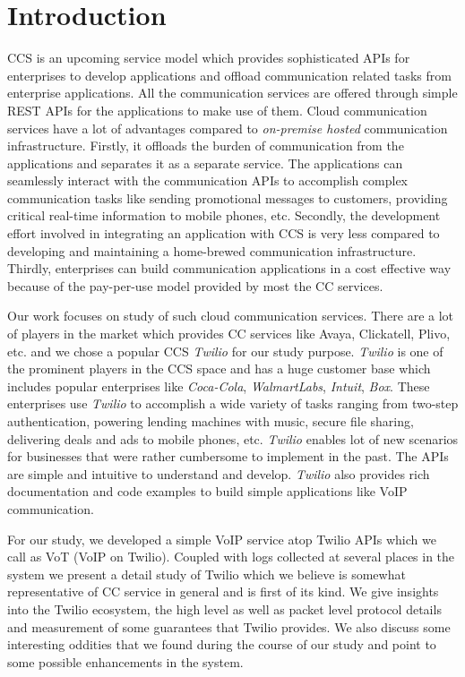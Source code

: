 \section{Introduction}
\label{sec-intro}
CCS is an upcoming service model which provides sophisticated APIs for enterprises to develop applications and offload communication related tasks from enterprise applications. 
All the communication services are offered through simple REST APIs for the applications to make use of them. Cloud communication services have a lot of advantages compared to \textit{on-premise hosted} communication infrastructure. Firstly, it offloads the burden of communication from the applications and separates it as a separate service. The applications can seamlessly interact with the communication APIs to accomplish complex communication tasks like sending promotional messages to customers, providing critical real-time information to mobile phones, etc. Secondly, the development effort involved in integrating an application with CCS is very less compared to developing and maintaining a home-brewed communication infrastructure.
Thirdly, enterprises can build communication applications in a cost effective way because of the pay-per-use model provided by most the CC services. 


Our work focuses on study of such cloud communication services. There are a lot of players in the market which provides CC services like Avaya, Clickatell, Plivo, etc. and we chose a popular CCS \textit{Twilio} for our study purpose. \textit{Twilio} is one of the prominent players in the CCS space and has a huge customer base which includes popular enterprises like \textit{Coca-Cola}, \textit{WalmartLabs}, \textit{Intuit}, \textit{Box}. These enterprises use \textit{Twilio} to accomplish a wide variety of tasks ranging from two-step authentication, powering lending machines with music, secure file sharing, delivering deals and ads to mobile phones, etc. \textit{Twilio} enables lot of new scenarios for businesses that were rather cumbersome to implement in the past. 
The APIs are simple and intuitive to understand and develop. \textit{Twilio} also provides rich documentation and code examples to build simple applications like VoIP communication.

 For our study, we developed a simple VoIP service atop Twilio APIs which we call as VoT (VoIP on Twilio). Coupled with logs collected at several places in the system we present a detail study of Twilio which we believe is somewhat representative of CC service in general and is first of its kind. We give insights into the Twilio ecosystem, the high level as well as packet level protocol details and measurement of some guarantees that Twilio provides. We also discuss some interesting oddities that we found during the course of our study and point to some possible enhancements in the system.
 

